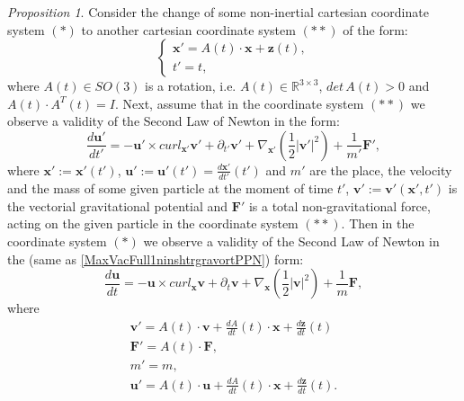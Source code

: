 \documentclass{article}
\newtheorem{proposition}{Proposition}[section]
\theoremstyle{definition}
\theoremstyle{remark}
\renewcommand{\vec}[1]{\mathbf{#1}}
\newcommand{\R}{\mathbb{R}}
\newcommand{\er}{\eqref}
\newcommand{\R}{{\mathbb{R}}}
\newcommand{\er}{\eqref}
\newtheorem{proposition}{Proposition}
\begin{document}
\begin{proposition}\label{gjghghgghg}
Consider the change of some non-inertial cartesian coordinate system
$(*)$ to another cartesian coordinate system $(**)$ of the form:
\begin{equation}\label{noninchgravortPPNnnn}
\begin{cases}
\vec x'=A(t)\cdot\vec x+\vec z(t),\\
t'=t,
\end{cases}
\end{equation}
where $A(t)\in SO(3)$ is a rotation, i.e. $A(t)\in \R^{3\times 3}$,
$det\, A(t)>0$ and $A(t)\cdot A^T(t)=I$. Next, assume that in the
coordinate system $(**)$ we observe a validity of the Second Law of
Newton in the form:
\begin{equation}\label{MaxVacFull1ninshtrgravortPPN}
\frac{d\vec u'}{dt'}=-\vec u'\times curl_{\vec x'}\vec
v'+\partial_{t'}\vec v'+\nabla_{\vec x'}\left(\frac{1}{2}|\vec
v'|^2\right)+\frac{1}{m'}\vec F',
\end{equation}
where $\vec x':=\vec x'(t')$, $\vec u':=\vec u'(t')=\frac{d\vec
x'}{dt'}(t')$ and $m'$ are the place, the velocity and the mass of
some given particle at the moment of time $t'$, $\vec v':=\vec
v'(\vec x',t')$ is the vectorial gravitational potential and $\vec
F'$ is a total non-gravitational force, acting on the given particle
in the coordinate system $(**)$. Then in the coordinate system $(*)$
we observe a validity of the Second Law of Newton in the (same as
\er{MaxVacFull1ninshtrgravortPPN}) form:
\begin{equation}\label{MaxVacFull1ninshtrgravortjhhjPPNjffjf}
\frac{d\vec u}{dt}=-\vec u\times curl_{\vec x}\vec
v+\partial_{t}\vec v+\nabla_{\vec x}\left(\frac{1}{2}|\vec
v|^2\right)+\frac{1}{m}\vec F,
\end{equation}
where
\begin{align}
\label{NoIn5gravortPPN11}\vec v'=A(t)\cdot \vec
v+\frac{dA}{dt}(t)\cdot\vec x+\frac{d\vec z}{dt}(t)\\
\label{NoIn1gravortPPN11}\vec F'=A(t)\cdot\vec F,\\
\label{NoIn2gravortPPN11}m'=m,\\
\label{NoIn3gravortPPN11}\vec u'=A(t)\cdot \vec
u+\frac{dA}{dt}(t)\cdot\vec x+\frac{d\vec z}{dt}(t).
\end{align}
\end{proposition}
\end{document}

